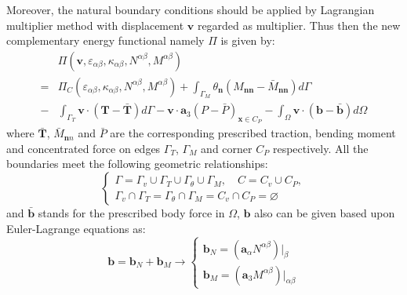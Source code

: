 Moreover, the natural boundary conditions should be applied by Lagrangian multiplier method with displacement $\boldsymbol v$ regarded as multiplier. Thus then the new complementary energy functional namely $\Pi$ is given by:
\begin{equation} \label{functional}
\begin{split}
&\Pi(\boldsymbol v, \varepsilon_{\alpha\beta},\kappa_{\alpha\beta},N^{\alpha\beta},M^{\alpha\beta}) \\
=&\Pi_C(\varepsilon_{\alpha\beta},\kappa_{\alpha\beta},N^{\alpha\beta},M^{\alpha\beta})
+ \int_{\Gamma_M} \theta_{\boldsymbol n} (M_{\boldsymbol{nn}} - \bar M_{\boldsymbol{nn}}) d\Gamma \\
- &\int_{\Gamma_T} \boldsymbol v \cdot (\boldsymbol T - \bar{\boldsymbol T})d\Gamma - \boldsymbol v \cdot \boldsymbol a_3 (P - \bar{P})_{\boldsymbol x \in C_P}
- \int_\Omega \boldsymbol v \cdot (\boldsymbol b - \bar{\boldsymbol b}) d\Omega 
\end{split}
\end{equation}
where $\bar{\boldsymbol T}$, $\bar M_{\boldsymbol nn}$ and $\bar P$ are the corresponding prescribed traction, bending moment and concentrated force on edges $\Gamma_T$, $\Gamma_M$ and corner $C_P$ respectively. All the boundaries meet the following geometric relationships:
\begin{equation}\label{geo}
\begin{cases}
\Gamma=\Gamma_v \cup \Gamma_T \cup \Gamma_\theta \cup \Gamma_M, \quad C = C_v \cup C_P, \\
\Gamma_v \cap \Gamma_T = \Gamma_\theta \cap \Gamma_M = C_v \cap C_P = \varnothing
\end{cases}
\end{equation}
and $\bar{\boldsymbol b}$ stands for the prescribed body force in $\Omega$, $\boldsymbol b$ also can be given based upon Euler-Lagrange equations \cite{benzaken2021} as:
\begin{equation}
\boldsymbol b = \boldsymbol b_N + \boldsymbol b_M \rightarrow
\begin{cases}
\boldsymbol b_N = (\boldsymbol a_\alpha N^{\alpha\beta})\vert_\beta \\
\boldsymbol b_M = (\boldsymbol a_3 M^{\alpha\beta})\vert_{\alpha\beta}
\end{cases}
\end{equation}

